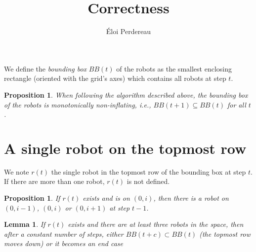 \documentclass[11pt, a4paper]{article}
\title{Correctness}
\author{\'Eloi Perdereau}
\theoremstyle{plain}
\newtheorem{lem}[thm]{Lemma}
\newtheorem{prop}[thm]{Proposition}
\theoremstyle{definition}
\theoremstyle{remark}
\begin{document}
\maketitle

We define the \textit{bounding box} $BB(t)$ of the robots as the smallest
enclosing rectangle (oriented with the grid's axes) which contains all robots
at step $t$.

\begin{prop}
When following the algorithm described above, the bounding box of the robots is
monotonically non-inflating, i.e., $BB(t+1) \subseteq BB(t)$ for all $t$.
\end{prop}

\section{A single robot on the topmost row}

We note $r(t)$ the single robot in the topmost row of the bounding box at step
$t$. If there are more than one robot, $r(t)$ is not defined.

\begin{prop}
If $r(t)$ exists and is on $(0,i)$, then there is a robot on $(0,i-1)$, $(0,i)$
or $(0,i+1)$ at step $t-1$.
\end{prop}

\begin{lem}
If $r(t)$ exists and there are at least three robots in the space, then after a
constant number of steps, either $BB(t+c) \subset BB(t)$ (the topmost row moves
down) or it becomes an end case
\end{lem}
\end{document}
